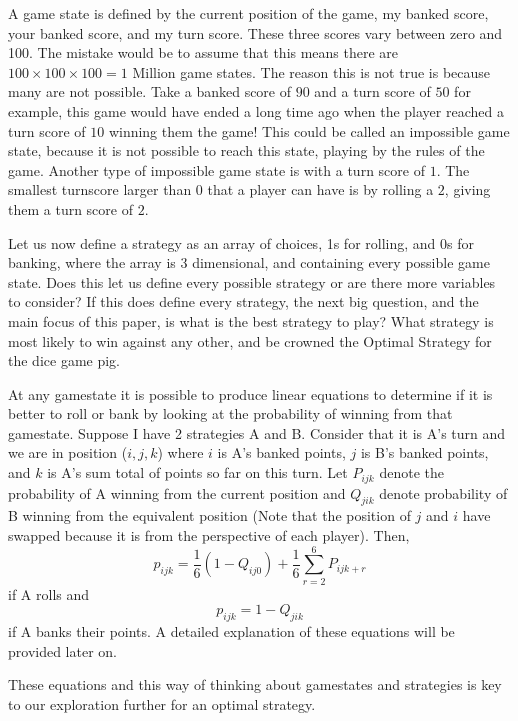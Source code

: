 \documentclass[a4paper,titlepage]{article}
\begin{document}
A game state is defined by the current position of the game, my banked score, your banked score, and my turn score.
These three scores vary between zero and 100. The mistake would be to assume that this means there are $100\times100\times100 = 1$ Million
game states. The reason this is not true is because many are not possible. Take a banked score of $90$ and a turn score of $50$ for example,
this game would have ended a long time ago when the player reached a turn score of $10$ winning them the game! This could be called an impossible
game state, because it is not possible to reach this state, playing by the rules of the game. Another type of impossible game state is
with a turn score of $1$. The smallest turnscore larger than $0$ that a player can have is by rolling a $2$, giving them a turn score of $2$.

Let us now define a strategy as an array of choices, 1s for rolling, and 0s for banking, where the array is 3 dimensional, and containing every
possible game state.
Does this let us define every possible strategy or are there more variables to consider?
If this does define every strategy, the next big question, and the main focus of this paper, is what is the best strategy to play?
What strategy is most likely to win against any other, and be crowned the Optimal Strategy for the dice game pig.

At any gamestate it is possible to produce linear equations to determine if it is better to roll or bank by looking at the probability of winning from that gamestate.
Suppose I have 2 strategies A and B. Consider that it is A's turn and we are in position ($i,j,k$) where $i$ is A's banked points,
$j$ is B's banked points, and $k$ is A's sum total of points so far on this turn. Let $P_{ijk}$ denote the probability of A winning
from the current position and $Q_{jik}$ denote probability of B winning from the equivalent position (Note that the position of $j$ and $i$ have swapped because it is
from the perspective of each player). Then,
\begin{equation}\label{1.2.1.a}
p_{ijk} = \dfrac{1}{6} (1-Q_{ij0}) + \dfrac{1}{6}\sum^{6}_{r=2}P_{ijk+r}
\end{equation}
 if A rolls and
 \begin{equation}\label{1.2.1.b}
 p_{ijk} = 1-Q_{jik}
 \end{equation}
 if A banks their points. A detailed explanation of these equations will be provided later on.

 These equations and this way of thinking about gamestates and strategies is key to our exploration further for an optimal strategy.
\end{document}

